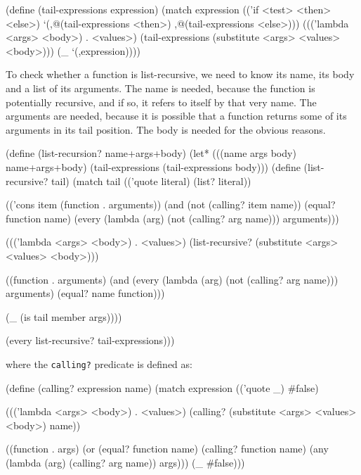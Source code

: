 \begin{Snippet}
  (define (tail-expressions expression)
    (match expression
      (('if <test> <then> <else>)
       `(,@(tail-expressions <then>) ,@(tail-expressions <else>)))
      ((('lambda <args> <body>) . <values>)
       (tail-expressions (substitute <args> <values> <body>)))
      (_
       `(,expression))))
\end{Snippet}

To check whether a function is list-recursive, we need to know
its name, its body and a list of its arguments. The name is needed,
because the function is potentially recursive, and if so, it refers
to itself by that very name. The arguments are needed, because it is
possible that a function returns some of its arguments in its tail
position. The body is needed for the obvious reasons.

\begin{Snippet}
  (define (list-recursion? name+args+body)
    (let* (((name args body) name+args+body)
           (tail-expressions (tail-expressions body)))
       (define (list-recursive? tail)
         (match tail
           (('quote literal)
            (list? literal))

           (('cons item (function . arguments))
            (and (not (calling? item name))
                 (equal? function name)
                 (every (lambda (arg)
                          (not (calling? arg name)))
                        arguments)))

           ((('lambda <args> <body>) . <values>)
            (list-recursive? (substitute <args> <values> <body>)))

           ((function . arguments)
            (and (every (lambda (arg)
                          (not (calling? arg name)))
                        arguments)
                 (equal? name function)))

           (_
            (is tail member args))))
                        
    (every list-recursive? tail-expressions)))
\end{Snippet}

where the \texttt{calling?}\,\,predicate is defined as:

\begin{Snippet}
  (define (calling? expression name)
    (match expression
      (('quote _)
       #false)

      ((('lambda <args> <body>) . <values>)
       (calling? (substitute <args> <values> <body>) name))

      ((function . args)
       (or (equal? function name)
           (calling? function name)
	   (any (lambda (arg)
		  (calling? arg name))
	        args)))
      (_
       #false)))
\end{Snippet}

